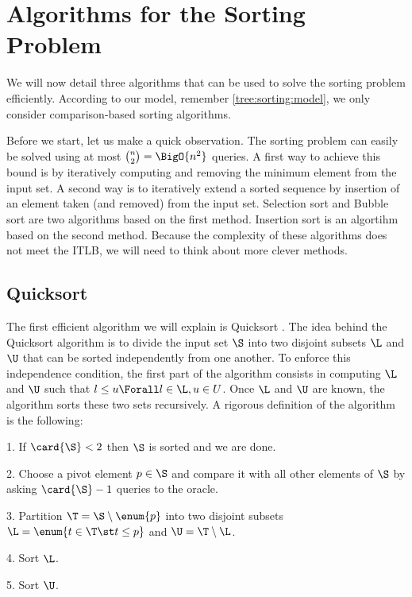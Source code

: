 \section{Algorithms for the Sorting Problem}
\label{tree:sorting:alg}

We will now detail three algorithms that can be used to solve the sorting
problem efficiently. According to our model, remember \ref{tree:sorting:model},
we only consider comparison-based sorting algorithms.


Before we start, let us make a quick observation. The sorting problem can
easily be solved using at most \(\binom{n}{2} = \BigO{n^2}\) queries. A first
way to achieve this bound is by iteratively computing and removing the minimum
element from the input set. A second way is to iteratively
extend a sorted sequence by insertion of an element taken (and removed) from
the input set. Selection sort and Bubble sort are two algorithms based on the
first method. Insertion sort is an algortihm based on the second method.
Because the complexity of these algorithms does not meet the ITLB, we will need
to think about more clever methods.

\subsection*{Quicksort}

The first efficient algorithm we will explain is Quicksort \cite{hoare:1962}.
The idea behind the Quicksort algorithm is to divide the input set \(\S\) into
two disjoint subsets \(\L\) and \(\U\) that can be sorted independently from
one another. To enforce this independence condition, the first part of
the algorithm consists in computing \(\L\) and \(\U\) such that \(l \le u \Forall l
\in \L, u \in U\). Once \(\L\) and \(\U\) are known, the algorithm sorts these
two sets recursively. A rigorous definition of the algorithm is the following:

\begin{algorithm}
\item[1.] If \(\card{\S} < 2\) then \(\S\) is sorted and we are done.
\item[2.] Choose a pivot element \(p \in \S\) and compare it with all other
elements of \(\S\) by asking \(\card{\S} - 1\) queries to the oracle.
\item[3.] Partition \(\T = \S \setminus \enum{p}\) into two disjoint subsets
\(\L = \enum{t \in \T \st t \le p}\) and \(\U = \T \setminus \L\).
\item[4.] Sort \(\L\).
\item[5.] Sort \(\U\).
\end{algorithm}

